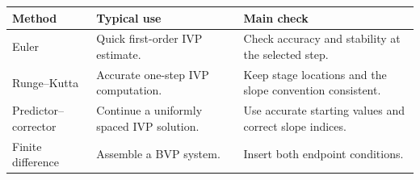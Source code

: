 \documentclass[12pt,a4paper]{article}
\begin{document}
\begin{tcolorbox}[tikzbox, title={Summary Comparison}]
\par\vspace{5pt}
\begingroup
\setlength{\extrarowheight}{1pt}
\noindent\begin{tabularx}{\linewidth}{|B{3.45cm}|Y|Y|}
\hline
\textbf{Method} & \textbf{Typical use} & \textbf{Main check} \\ \hline
Euler & Quick first-order IVP estimate. & Check accuracy and stability at the selected step. \\ \hline
Runge--Kutta & Accurate one-step IVP computation. & Keep stage locations and the slope convention consistent. \\ \hline
Predictor--corrector & Continue a uniformly spaced IVP solution. & Use accurate starting values and correct slope indices. \\ \hline
Finite difference & Assemble a BVP system. & Insert both endpoint conditions. \\ \hline
\end{tabularx}\par
\endgroup
\end{tcolorbox}
\end{document}
